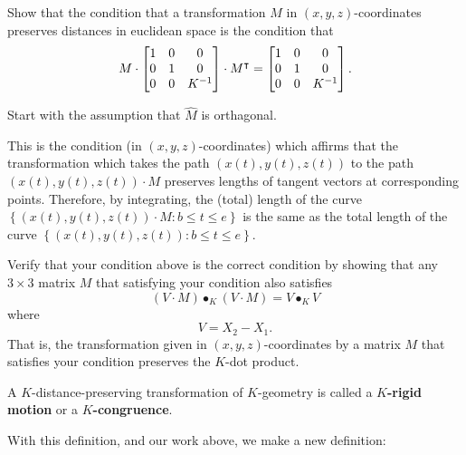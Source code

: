 \documentclass{ximera}
\begin{document}
\begin{problem}
Show that the condition that a transformation $M$ in
$\left(x,y,z\right)$-coordinates preserves distances in euclidean
space is the condition that%
\[
M\cdot\begin{bmatrix}
1 & 0 & 0\\
0 & 1 & 0\\
0 & 0 & K^{-1}
\end{bmatrix}
  \cdot M^\intercal=\begin{bmatrix}
1 & 0 & 0\\
0 & 1 & 0\\
0 & 0 & K^{-1}
\end{bmatrix}. 
  \]
  \begin{hint}
    Start with the assumption that $\hat{M}$ is orthagonal.
  \end{hint}

\end{problem}

This is the condition (in $\left(  x,y,z\right)  $-coordinates) which affirms
that the transformation which takes the path $\left(  x(t),y(t),z(t)\right)  $
to the path $\left(  x(t),y(t),z(t)\right)  \cdot M$ preserves lengths of
tangent vectors at corresponding points. Therefore, by integrating, the
(total) length of the curve $\left\{  \left(  x(t),y(t),z(t)\right)  \cdot
M:b\leq t\leq e\right\}  $ is the same as the total length of the curve
$\left\{  \left(  x(t),y(t),z(t)\right)  :b\leq t\leq e\right\}  $.

\begin{problem}
Verify that your condition above is the correct condition by showing
that any $3\times3$ matrix $M$ that satisfying your condition also satisfies%
\[
\left(   V  \cdot M\right)  \bullet_{K}\left(   V
\cdot M\right)  =V\bullet_{K}V
\]
where%
\[
V=X_{2}-X_{1}.
\]
That is, the transformation given in $\left( x,y,z\right)
$-coordinates by a matrix $M$ that satisfies your condition preserves
the $K$-dot product.
\end{problem}





\begin{definition}
A $K$-distance-preserving transformation of $K$-geometry is called a
$K$\textbf{-rigid motion} or a $K$\textbf{-congruence}.
\end{definition}

With this definition, and our work above, we make a new definition:
\end{document}
